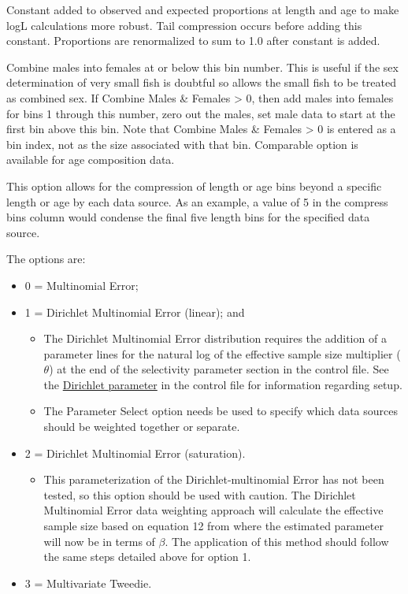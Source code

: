 Constant added to observed and expected proportions at length and age to make logL calculations more robust.  Tail compression occurs before adding this constant.  Proportions are renormalized to sum to 1.0 after constant is added.

Combine males into females at or below this bin number.  This is useful if the sex determination of very small fish is doubtful so allows the small fish to be treated as combined sex.  If Combine Males \& Females > 0, then add males into females for bins 1 through this number, zero out the males, set male data to start at the first bin above this bin.  Note that Combine Males \& Females > 0 is entered as a bin index, not as the size associated with that bin.  Comparable option is available for age composition data.

This option allows for the compression of length or age bins beyond a specific length or age by each data source.  As an example,  a value of 5 in the compress bins column would condense the final five length bins for the specified data source.

The options are:
\begin{itemize}
	\item 0 = Multinomial Error;
	\item 1 = Dirichlet Multinomial Error (linear); and
	\begin{itemize}
		\item The Dirichlet Multinomial Error distribution requires the addition of a parameter lines for the natural log of the effective sample size multiplier ($\theta$) at the end of the selectivity parameter section in the control file. See the \hyperlink{Dirichletparameter}{Dirichlet parameter} in the control file for information regarding setup.
		\item The Parameter Select option needs be used to specify which data sources should be weighted together or separate. 
	\end{itemize}
	\item 2 = Dirichlet Multinomial Error (saturation).
	\begin{itemize}
		\item This parameterization of the Dirichlet-multinomial Error has not been tested, so this option should be used with caution. The Dirichlet Multinomial Error data weighting approach will calculate the effective sample size based on equation 12 from \citet{thorson-model-based-2017} where the estimated parameter will now be in terms of $\beta$. The application of this method should follow the same steps detailed above for option 1. 
	\end{itemize}
	\item 3 = Multivariate Tweedie.
\end{itemize}


